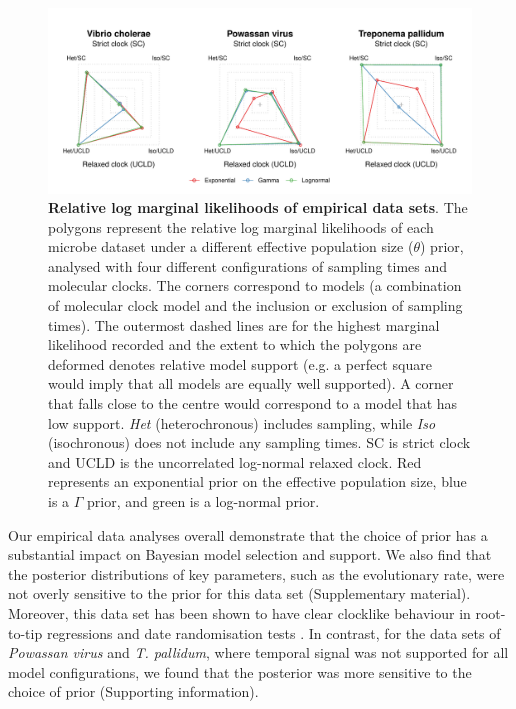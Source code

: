 \documentclass[10pt,letterpaper]{article}
\begin{document}
\begin{figure}
	\begin{center}
		\includegraphics[width=14cm]{sandbox_figures/polygon_plot.pdf}\newline
		\vspace{-0.5cm}
		\caption{\textbf{Relative log marginal likelihoods of empirical data sets}. {The polygons represent the relative log marginal likelihoods of each microbe dataset under a different effective population size ($\theta$) prior, analysed with four different configurations of sampling times and molecular clocks. The corners correspond to models (a combination of molecular clock model and the inclusion or exclusion of sampling times). The outermost dashed lines are for the highest marginal likelihood recorded and the extent to which the polygons are deformed denotes relative model support (e.g. a perfect square would imply that all models are equally well supported). A corner that falls close to the centre would correspond to a model that has low support.} \textit{Het} (heterochronous) includes sampling, while \textit{Iso} (isochronous) does not include any sampling times. SC is strict clock and UCLD is the uncorrelated log-normal relaxed clock. Red represents an exponential prior on the effective population size, blue is a $\Gamma$ prior, and green is a log-normal prior.}
		\label{figure:polygon_plots}
	\end{center}
\end{figure}

Our empirical data analyses overall demonstrate that the choice of prior has a substantial impact on Bayesian model selection and support. We also find that the posterior distributions of key parameters, such as the evolutionary rate, were not overly sensitive to the prior for this data set (Supplementary material). Moreover, this data set has been shown to have clear clocklike behaviour in root-to-tip regressions and date randomisation tests \cite{duchene2016genome}. In contrast, for the data sets of \textit{Powassan virus} and \textit{T. pallidum}, where temporal signal was not supported for all model configurations, we found that the posterior was more sensitive to the choice of prior (Supporting information).
\end{document}
